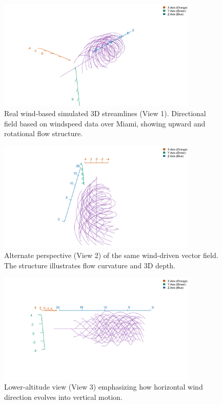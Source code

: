 \documentclass[11pt]{article}
\begin{document}
	\vspace{0.5em}
	
	\begin{figure}[H]
		\centering
		\includegraphics[width=0.85\textwidth]{vortex_view1.png}
		\caption{Real wind-based simulated 3D streamlines (View 1). Directional field based on windspeed data over Miami, showing upward and rotational flow structure.}
		\label{fig:wind_streamlines_1}
	\end{figure}
	
	\begin{figure}[H]
		\centering
		\includegraphics[width=0.85\textwidth]{vortex_view2.png}
		\caption{Alternate perspective (View 2) of the same wind-driven vector field. The structure illustrates flow curvature and 3D depth.}
		\label{fig:wind_streamlines_2}
	\end{figure}
	
	\begin{figure}[H]
		\centering
		\includegraphics[width=0.85\textwidth]{vortex_view3.png}
		\caption{Lower-altitude view (View 3) emphasizing how horizontal wind direction evolves into vertical motion.}
		\label{fig:wind_streamlines_3}
	\end{figure}
	
\end{document}
